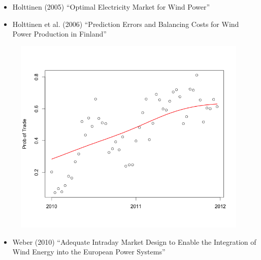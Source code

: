 \documentclass{beamer}
\begin{document}
\begin{frame}[plain]
	\begin{itemize}
	\item Holttinen (2005) ``Optimal Electricity Market for Wind Power''
	\item Holttinen et al. (2006) ``Prediction Errors and Balancing Costs for Wind Power Production in Finland''
	\
	\end{itemize}
\end{frame}

\begin{frame}[plain]
	\begin{figure}
	\includegraphics[width=1\textwidth]{figures/ElbTradeOverTime.png}
	\end{figure}
\end{frame}

\begin{frame}[plain]
	\begin{itemize}
	\item Weber (2010) ``Adequate Intraday Market Design to Enable the Integration of Wind Energy into the European Power Systems''
	\end{itemize}
\end{frame}
\end{document}
